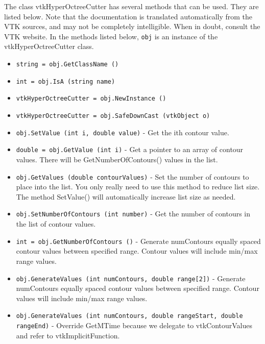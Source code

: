 The class vtkHyperOctreeCutter has several methods that can be used.
  They are listed below.
Note that the documentation is translated automatically from the VTK sources,
and may not be completely intelligible.  When in doubt, consult the VTK website.
In the methods listed below, \verb|obj| is an instance of the vtkHyperOctreeCutter class.
\begin{itemize}
\item  \verb|string = obj.GetClassName ()|

\item  \verb|int = obj.IsA (string name)|

\item  \verb|vtkHyperOctreeCutter = obj.NewInstance ()|

\item  \verb|vtkHyperOctreeCutter = obj.SafeDownCast (vtkObject o)|

\item  \verb|obj.SetValue (int i, double value)| -  Get the ith contour value.

\item  \verb|double = obj.GetValue (int i)| -  Get a pointer to an array of contour values. There will be
 GetNumberOfContours() values in the list.

\item  \verb|obj.GetValues (double contourValues)| -  Set the number of contours to place into the list. You only really
 need to use this method to reduce list size. The method SetValue()
 will automatically increase list size as needed.

\item  \verb|obj.SetNumberOfContours (int number)| -  Get the number of contours in the list of contour values.

\item  \verb|int = obj.GetNumberOfContours ()| -  Generate numContours equally spaced contour values between specified
 range. Contour values will include min/max range values.

\item  \verb|obj.GenerateValues (int numContours, double range[2])| -  Generate numContours equally spaced contour values between specified
 range. Contour values will include min/max range values.

\item  \verb|obj.GenerateValues (int numContours, double rangeStart, double rangeEnd)| -  Override GetMTime because we delegate to vtkContourValues and refer to
 vtkImplicitFunction.


\end{itemize}
